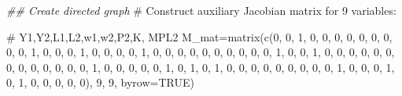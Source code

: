 \documentclass[
  letterpaper,
  DIV=11,
  numbers=noendperiod]{scrreprt}
\newenvironment{Shaded}{\begin{snugshade}}{\end{snugshade}}
\newcommand{\AttributeTok}[1]{\textcolor[rgb]{0.40,0.45,0.13}{#1}}
\newcommand{\CommentTok}[1]{\textcolor[rgb]{0.37,0.37,0.37}{#1}}
\newcommand{\ConstantTok}[1]{\textcolor[rgb]{0.56,0.35,0.01}{#1}}
\newcommand{\DecValTok}[1]{\textcolor[rgb]{0.68,0.00,0.00}{#1}}
\newcommand{\DocumentationTok}[1]{\textcolor[rgb]{0.37,0.37,0.37}{\textit{#1}}}
\newcommand{\FunctionTok}[1]{\textcolor[rgb]{0.28,0.35,0.67}{#1}}
\newcommand{\NormalTok}[1]{\textcolor[rgb]{0.00,0.23,0.31}{#1}}
\newcommand{\OtherTok}[1]{\textcolor[rgb]{0.00,0.23,0.31}{#1}}
\begin{document}
\begin{Shaded}
\begin{Highlighting}[]
\DocumentationTok{\#\# Create directed graph}
\CommentTok{\# Construct auxiliary Jacobian matrix for 9 variables: }

\CommentTok{\#              Y1,Y2,L1,L2,w1,w2,P2,K, MPL2}
\NormalTok{M\_mat}\OtherTok{=}\FunctionTok{matrix}\NormalTok{(}\FunctionTok{c}\NormalTok{(}\DecValTok{0}\NormalTok{, }\DecValTok{0}\NormalTok{, }\DecValTok{1}\NormalTok{, }\DecValTok{0}\NormalTok{, }\DecValTok{0}\NormalTok{, }\DecValTok{0}\NormalTok{, }\DecValTok{0}\NormalTok{, }\DecValTok{0}\NormalTok{, }\DecValTok{0}\NormalTok{,}
               \DecValTok{0}\NormalTok{, }\DecValTok{0}\NormalTok{, }\DecValTok{0}\NormalTok{, }\DecValTok{1}\NormalTok{, }\DecValTok{0}\NormalTok{, }\DecValTok{0}\NormalTok{, }\DecValTok{0}\NormalTok{, }\DecValTok{1}\NormalTok{, }\DecValTok{0}\NormalTok{,}
               \DecValTok{0}\NormalTok{, }\DecValTok{0}\NormalTok{, }\DecValTok{0}\NormalTok{, }\DecValTok{1}\NormalTok{, }\DecValTok{0}\NormalTok{, }\DecValTok{0}\NormalTok{, }\DecValTok{0}\NormalTok{, }\DecValTok{0}\NormalTok{, }\DecValTok{0}\NormalTok{, }
               \DecValTok{0}\NormalTok{, }\DecValTok{0}\NormalTok{, }\DecValTok{0}\NormalTok{, }\DecValTok{0}\NormalTok{, }\DecValTok{0}\NormalTok{, }\DecValTok{1}\NormalTok{, }\DecValTok{0}\NormalTok{, }\DecValTok{0}\NormalTok{, }\DecValTok{1}\NormalTok{, }
               \DecValTok{0}\NormalTok{, }\DecValTok{0}\NormalTok{, }\DecValTok{0}\NormalTok{, }\DecValTok{0}\NormalTok{, }\DecValTok{0}\NormalTok{, }\DecValTok{0}\NormalTok{, }\DecValTok{0}\NormalTok{, }\DecValTok{0}\NormalTok{, }\DecValTok{0}\NormalTok{,}
               \DecValTok{0}\NormalTok{, }\DecValTok{0}\NormalTok{, }\DecValTok{0}\NormalTok{, }\DecValTok{0}\NormalTok{, }\DecValTok{1}\NormalTok{, }\DecValTok{0}\NormalTok{, }\DecValTok{0}\NormalTok{, }\DecValTok{0}\NormalTok{, }\DecValTok{0}\NormalTok{,}
               \DecValTok{0}\NormalTok{, }\DecValTok{1}\NormalTok{, }\DecValTok{0}\NormalTok{, }\DecValTok{1}\NormalTok{, }\DecValTok{0}\NormalTok{, }\DecValTok{1}\NormalTok{, }\DecValTok{0}\NormalTok{, }\DecValTok{0}\NormalTok{, }\DecValTok{0}\NormalTok{,}
               \DecValTok{0}\NormalTok{, }\DecValTok{0}\NormalTok{, }\DecValTok{0}\NormalTok{, }\DecValTok{0}\NormalTok{, }\DecValTok{0}\NormalTok{, }\DecValTok{0}\NormalTok{, }\DecValTok{1}\NormalTok{, }\DecValTok{0}\NormalTok{, }\DecValTok{0}\NormalTok{,}
               \DecValTok{0}\NormalTok{, }\DecValTok{1}\NormalTok{, }\DecValTok{0}\NormalTok{, }\DecValTok{1}\NormalTok{, }\DecValTok{0}\NormalTok{, }\DecValTok{0}\NormalTok{, }\DecValTok{0}\NormalTok{, }\DecValTok{0}\NormalTok{, }\DecValTok{0}\NormalTok{), }\DecValTok{9}\NormalTok{, }\DecValTok{9}\NormalTok{, }\AttributeTok{byrow=}\ConstantTok{TRUE}\NormalTok{)}


\end{Highlighting}
\end{Shaded}
\end{document}
